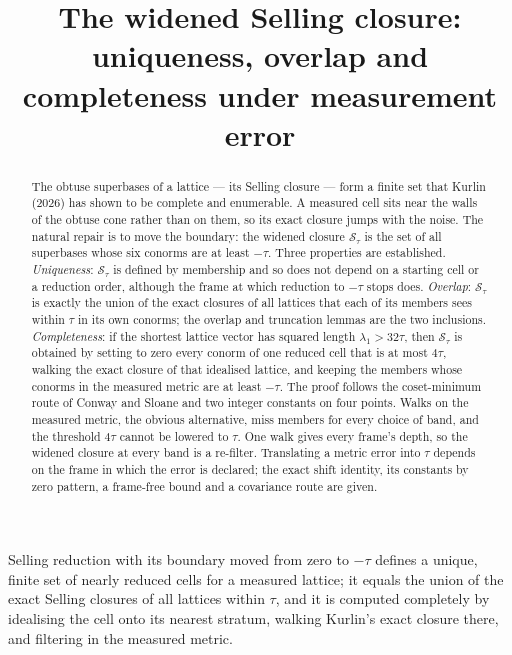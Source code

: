 \documentclass[preprint,pdf]{iucr}          %
\newcommand{\Sw}{\mathcal{S}_\tau}
\begin{document}

\title{The widened Selling closure: uniqueness, overlap and completeness under measurement error}



\maketitle                        %

\begin{synopsis}
Selling reduction with its boundary moved from zero to $-\tau$ defines a unique, finite set of nearly reduced cells for a measured lattice; it equals the union of the exact Selling closures of all lattices within $\tau$, and it is computed completely by idealising the cell onto its nearest stratum, walking Kurlin's exact closure there, and filtering in the measured metric.
\end{synopsis}

\begin{abstract}
The obtuse superbases of a lattice --- its Selling closure --- form a finite set that Kurlin (2026) has shown to be complete and enumerable. A measured cell sits near the walls of the obtuse cone rather than on them, so its exact closure jumps with the noise. The natural repair is to move the boundary: the widened closure $\Sw$ is the set of all superbases whose six conorms are at least $-\tau$. Three properties are established. \emph{Uniqueness}: $\Sw$ is defined by membership and so does not depend on a starting cell or a reduction order, although the frame at which reduction to $-\tau$ stops does. \emph{Overlap}: $\Sw$ is exactly the union of the exact closures of all lattices that each of its members sees within $\tau$ in its own conorms; the overlap and truncation lemmas are the two inclusions. \emph{Completeness}: if the shortest lattice vector has squared length $\lambda_1>32\tau$, then $\Sw$ is obtained by setting to zero every conorm of one reduced cell that is at most $4\tau$, walking the exact closure of that idealised lattice, and keeping the members whose conorms in the measured metric are at least $-\tau$. The proof follows the coset-minimum route of Conway and Sloane and two integer constants on four points. Walks on the measured metric, the obvious alternative, miss members for every choice of band, and the threshold $4\tau$ cannot be lowered to $\tau$. One walk gives every frame's depth, so the widened closure at every band is a re-filter. Translating a metric error into $\tau$ depends on the frame in which the error is declared; the exact shift identity, its constants by zero pattern, a frame-free bound and a covariance route are given.
\end{abstract}
\end{document}
